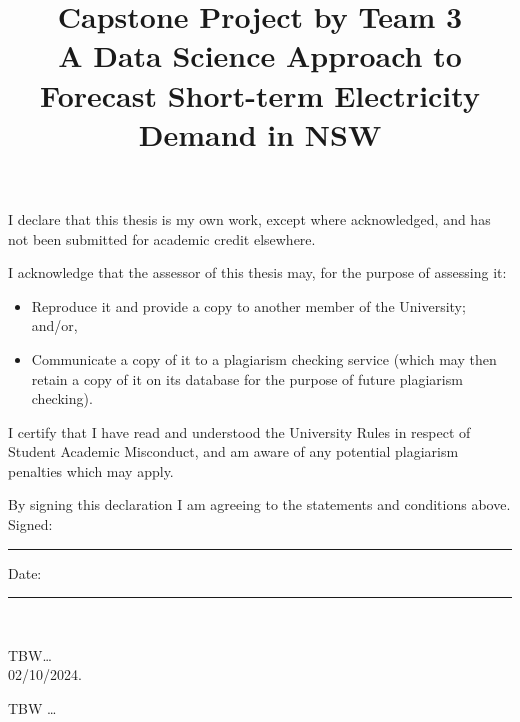 \documentclass[mstat,12pt]{unswthesis}
\title{Capstone Project by Team 3\\[0.5cm]A Data Science Approach to
Forecast Short-term Electricity Demand in NSW}
\author{\Authornameonly}
\begin{document}
\beforepreface




\vskip 2pc \noindent I declare that this thesis is my
own work, except where acknowledged, and has not been submitted for
academic credit elsewhere. 

\vskip 2pc  \noindent I acknowledge that the assessor of this
thesis may, for the purpose of assessing it:
\begin{itemize}
\item Reproduce it and provide a copy to another member of the University; and/or,
\item Communicate a copy of it to a plagiarism checking service (which may then retain a copy of it on its database for the purpose of future plagiarism checking).
\end{itemize}

\vskip 2pc \noindent I certify that I have read and understood the University Rules in
respect of Student Academic Misconduct, and am aware of any potential plagiarism penalties which may 
apply.\vspace{24pt}

\vskip 2pc \noindent By signing 
this declaration I am
agreeing to the statements and conditions above.
\vskip 2pc \noindent
Signed: \rule{7cm}{0.25pt} \hfill Date: \rule{4cm}{0.25pt} \\[1cm]
\vskip 1pc





{\bigskip}TBW\ldots{}\\[1cm] 

{\bigskip\bigskip\bigskip\noindent} 02/10/2024.




TBW \ldots{}



\afterpreface





%
%
\end{document}
